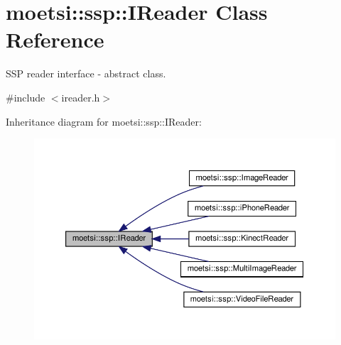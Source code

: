 \hypertarget{classmoetsi_1_1ssp_1_1IReader}{}\section{moetsi\+:\+:ssp\+:\+:I\+Reader Class Reference}
\label{classmoetsi_1_1ssp_1_1IReader}


S\+SP reader interface -\/ abstract class.  




{\ttfamily \#include $<$ireader.\+h$>$}



Inheritance diagram for moetsi\+:\+:ssp\+:\+:I\+Reader\+:\nopagebreak
\begin{figure}[H]
\begin{center}
\leavevmode
\includegraphics[width=350pt]{classmoetsi_1_1ssp_1_1IReader__inherit__graph}
\end{center}
\end{figure}
